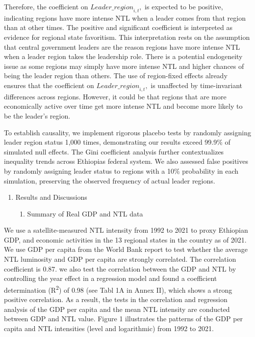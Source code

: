 Therefore, the coefficient on \({Leader\_ region}_{i,t},\) is expected
to be positive, indicating regions have more intense NTL when a leader
comes from that region than at other times. The positive and significant
coefficient is interpreted as evidence for regional state favoritism.
This interpretation rests on the assumption that central government
leaders are the reason regions have more intense NTL when a leader
region takes the leadership role. There is a potential endogeneity issue
as some regions may simply have more intense NTL and higher chances of
being the leader region than others. The use of region-fixed effects
already ensures that the coefficient on \({Leader\_ region}_{i,t},\) is
unaffected by time-invariant differences across regions. However, it
could be that regions that are more economically active over time get
more intense NTL and become more likely to be the leader's region.

To establish causality, we implement rigorous placebo tests by randomly
assigning \textquotesingle leader region\textquotesingle{} status 1,000
times, demonstrating our results exceed 99.9\% of simulated null
effects. The Gini coefficient analysis further contextualizes inequality
trends across Ethiopia\textquotesingle s federal system. We also
assessed false positives by randomly assigning leader status to regions
with a 10\% probability in each simulation, preserving the observed
frequency of actual leader regions.

\begin{enumerate}
\def\labelenumi{\arabic{enumi}.}
\setcounter{enumi}{2}
\item
  Results and Discussions

  \begin{enumerate}
  \def\labelenumii{\arabic{enumii}.}
  \item
    Summary of Real GDP and NTL data
  \end{enumerate}
\end{enumerate}

We use a satellite-measured NTL intensity from 1992 to 2021 to proxy
Ethiopian GDP, and economic activities in the 13 regional states in the
country as of 2021. We use GDP per capita from the World Bank report to
test whether the average NTL luminosity and GDP per capita are strongly
correlated. The correlation coefficient is 0.87. we also test the
correlation between the GDP and NTL by controlling the year effect in a
regression model and found a coefficient determination
(R\textsuperscript{2}) of 0.98 (see Tabl 1A in Annex II), which shows a
strong positive correlation. As a result, the tests in the correlation
and regression analysis of the GDP per capita and the mean NTL intensity
are conducted between GDP and NTL value. Figure 1 illustrates the
patterns of the GDP per capita and NTL intensities (level and
logarithmic) from 1992 to 2021.

